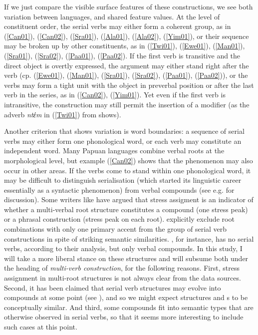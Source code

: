 If we just compare the visible surface features of these constructions, we see both variation between languages, and shared feature values. At the level of constituent order, the serial verbs may either form a coherent group, as in (\ref{Can01}), (\ref{Can02}), (\ref{Sra01}), (\ref{Ala01}), (\ref{Ala02}), (\ref{Yim01}), or their sequence may be broken up by other constituents, as in (\ref{Twi01}), (\ref{Ewe01}), (\ref{Man01}), (\ref{Sra01}), (\ref{Sra02}), (\ref{Paa01}), (\ref{Paa02}). If the first verb is transitive and the direct object is overtly expressed, the argument may either stand right after the verb (cp. (\ref{Ewe01}), (\ref{Man01}), (\ref{Sra01}), (\ref{Sra02}), (\ref{Paa01}), (\ref{Paa02})), or the verbs may form a tight unit with the object in preverbal position or after the last verb in the series, as in (\ref{Can02}), (\ref{Yim01}). Yet even if the first verb is intransitive, the construction may still permit the insertion of a modifier (as the adverb \textit{ntέm} in (\ref{Twi01}) from  shows). 

Another criterion that shows variation is word boundaries: a sequence of serial verbs may either form one phonological word, or each verb may constitute an independent word. Many Papuan languages combine verbal roots at the morphological level, but example (\ref{Can02}) shows that the phenomenon may also occur in other areas. If the verbs come to stand within one phonological word, it may be difficult to distinguish serialisation (which started its linguistic career essentially as a syntactic phenomenon) from verbal compounds (see e.g. \citealt{vanstaden2008serial} for discussion). Some writers like \citet{devries2004} have argued that stress assigment is an indicator of whether a multi-verbal root structure constitutes a compound (one stress peak) or a phrasal construction (stress peak on each root).  explicitly exclude root combinations with only one primary accent from the group of serial verb constructions in spite of striking semantic similarities. , for instance, has no serial verbs, according to their analysis, but only verbal compounds. In this study, I will take a more liberal stance on these structures and will subsume both under the heading of \textit{multi-verb construction}, for the following reasons. First, stress assignment in multi-root structures is not always clear from the data sources. Second, it has been claimed that serial verb structures may evolve into compounds at some point (see \citealt[27]{vanstaden2008serial}), and so we might expect  structures and s to be conceptually similar. And third, some compounds fit into semantic types that are otherwise observed in serial verbs, so that it seems more interesting to include such cases at this point. 


